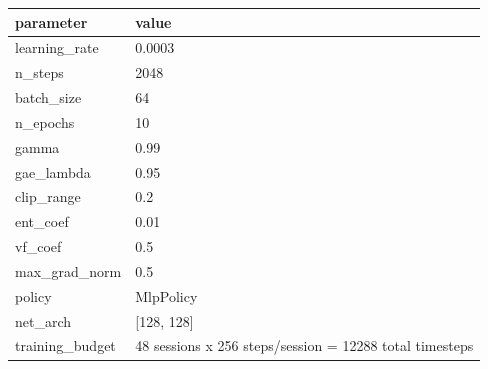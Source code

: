\begin{tabular}{ll}
\hline
parameter & value \\
\hline
learning\_rate & 0.0003 \\
n\_steps & 2048 \\
batch\_size & 64 \\
n\_epochs & 10 \\
gamma & 0.99 \\
gae\_lambda & 0.95 \\
clip\_range & 0.2 \\
ent\_coef & 0.01 \\
vf\_coef & 0.5 \\
max\_grad\_norm & 0.5 \\
policy & MlpPolicy \\
net\_arch & [128, 128] \\
training\_budget & 48 sessions x 256 steps/session = 12288 total timesteps \\
\hline
\end{tabular}
